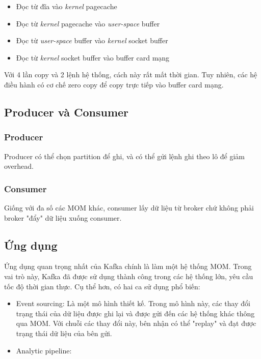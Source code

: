 \documentclass{article}
\begin{document}
\begin{itemize}
    \item Đọc từ đĩa vào \emph{kernel} pagecache
    \item Đọc từ \emph{kernel} pagecache vào \emph{user-space} buffer
    \item Đọc từ \emph{user-space} buffer vào \emph{kernel} socket buffer
    \item Đọc từ \emph{kernel} socket buffer vào buffer card mạng
\end{itemize}

Với 4 lần copy và 2 lệnh hệ thống, cách này rất mất thời gian. Tuy nhiên, các hệ
điều hành có cơ chế zero copy để copy trực tiếp vào buffer card mạng.

\subsection{Producer và Consumer}

\subsubsection{Producer}

Producer có thể chọn partition để ghi, và có thể gửi lệnh ghi theo lô để giảm
overhead.

\subsubsection{Consumer}

Giống với đa số các MOM khác, consumer lấy dữ liệu từ broker chứ không phải
broker "đẩy" dữ liệu xuống consumer.

\subsection{Ứng dụng}

Ứng dụng quan trọng nhất của Kafka chính là làm một hệ thống MOM.  Trong vai trò
này, Kafka đã được sử dụng thành công trong các hệ thống lớn, yêu cầu tốc độ
thời gian thực. Cụ thể hơn, có hai ca sử dụng phổ biến:

\begin{itemize}
    \item Event sourcing: Là một mô hình thiết kế. Trong mô hình này, các thay
    đổi trạng thái của dữ liệu được ghi lại và được gửi đến các hệ thống khác
    thông qua MOM. Với chuỗi các thay đổi này, bên nhận có thể "replay" và đạt
    được trạng thái dữ liệu của bên gửi.
    \item Analytic pipeline:
\end{itemize}
\end{document}
